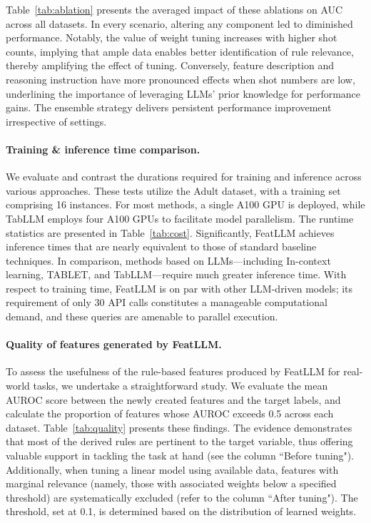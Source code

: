 Table~\ref{tab:ablation} presents the averaged impact of these ablations on AUC across all datasets. In every scenario, altering any component led to diminished performance. Notably, the value of weight tuning increases with higher shot counts, implying that ample data enables better identification of rule relevance, thereby amplifying the effect of tuning. Conversely, feature description and reasoning instruction have more pronounced effects when shot numbers are low, underlining the importance of leveraging LLMs' prior knowledge for performance gains. The ensemble strategy delivers persistent performance improvement irrespective of settings.

\vspace*{-0.12in}
\paragraph{Training \& inference time comparison.} We evaluate and contrast the durations required for training and inference across various approaches. These tests utilize the Adult dataset, with a training set comprising 16 instances. For most methods, a single A100 GPU is deployed, while TabLLM employs four A100 GPUs to facilitate model parallelism. The runtime statistics are presented in Table~\ref{tab:cost}. Significantly, \textsf{FeatLLM} achieves inference times that are nearly equivalent to those of standard baseline techniques. In comparison, methods based on LLMs—including In-context learning, TABLET, and TabLLM—require much greater inference time. With respect to training time, \textsf{FeatLLM} is on par with other LLM-driven models; its requirement of only 30 API calls constitutes a manageable computational demand, and these queries are amenable to parallel execution.

\vspace*{-0.12in}
\paragraph{Quality of features generated by \textsf{FeatLLM}.}
To assess the usefulness of the rule-based features produced by \textsf{FeatLLM} for real-world tasks, we undertake a straightforward study. We evaluate the mean AUROC score between the newly created features and the target labels, and calculate the proportion of features whose AUROC exceeds 0.5 across each dataset. Table~\ref{tab:quality} presents these findings. The evidence demonstrates that most of the derived rules are pertinent to the target variable, thus offering valuable support in tackling the task at hand (see the column ``Before tuning"). Additionally, when tuning a linear model using available data, features with marginal relevance (namely, those with associated weights below a specified threshold) are systematically excluded (refer to the column ``After tuning"). The threshold, set at 0.1, is determined based on the distribution of learned weights.


